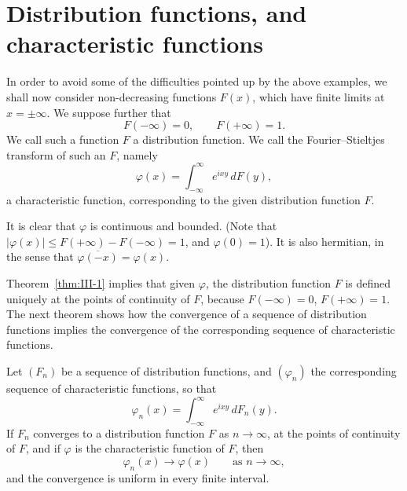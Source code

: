 \section{Distribution functions, and characteristic functions}
\label{sec:III-2}

In order to avoid some of the difficulties pointed up by the above examples, we shall now consider non-decreasing functions $F(x)$, which have finite limits at $x=\pm\infty$. We suppose further that
\begin{equation}\tag{2.1}\label{eq:III-2.1}
F(-\infty)=0,\qquad F(+\infty)=1.
\end{equation}
We call such a function $F$ a distribution function. We call the Fourier--Stieltjes transform of such an $F$, namely
\[
\varphi(x)=\int_{-\infty}^{\infty}e^{ixy}\,dF(y),
\]
a characteristic function, corresponding to the given distribution function $F$.

It is clear that $\varphi$ is continuous and bounded. (Note that $|\varphi(x)|\le F(+\infty)-F(-\infty)=1$, and $\varphi(0)=1$). It is also hermitian, in the sense that $\overline{\varphi(-x)}=\varphi(x)$.

Theorem~\ref{thm:III-1} implies that given $\varphi$, the distribution function $F$ is defined uniquely at the points of continuity of $F$, because $F(-\infty)=0$, $F(+\infty)=1$. The next theorem shows how the convergence of a sequence of distribution functions implies the convergence of the corresponding sequence of characteristic functions.

\begin{theorem}\label{thm:III-3}
Let $(F_{n})$ be a sequence of distribution functions, and $(\varphi_{n})$ the corresponding sequence of characteristic functions, so that
\begin{equation}\tag{2.2}\label{eq:III-2.2}
\varphi_{n}(x)=\int_{-\infty}^{\infty}e^{ixy}\,dF_{n}(y).
\end{equation}
If $F_{n}$ converges to a distribution function $F$ as $n\to\infty$, at the points of continuity of $F$, and if $\varphi$ is the characteristic function of $F$, then
\begin{equation}\tag{2.3}\label{eq:III-2.3}
\varphi_{n}(x)\to\varphi(x)\qquad\text{as }n\to\infty,
\end{equation}
and the convergence is uniform in every finite interval.
\end{theorem}


